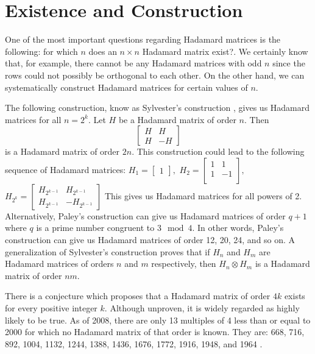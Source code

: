 \documentclass{article}
\theoremstyle{definition}
\begin{document}
\section{Existence and Construction}
One of the most important questions regarding Hadamard matrices is the following: for which $n$ does an $n \times n$ Hadamard matrix exist?. We certainly know that, for example, there cannot be any Hadamard matrices with odd $n$ since the rows could not possibly be orthogonal to each other. On the other hand, we can systematically construct Hadamard matrices for certain values of $n$.

The following construction, know as Sylvester's construction \cite{construction}, gives us Hadamard matrices for all $n = 2^k$. Let $H$ be a Hadamard matrix of order $n$. Then
\begin{equation*}
\begin{bmatrix}
H & H \\
H & -H
\end{bmatrix}
\end{equation*}
is a Hadamard matrix of order $2n$. This construction could lead to the following sequence of Hadamard matrices:
$H_1 =
\begin{bmatrix}
1
\end{bmatrix},
$
$H_2 =
\begin{bmatrix}
1 & 1 \\
1 & -1 \\
\end{bmatrix},
$
$H_{2^k} =
\begin{bmatrix}
H_{2^{k-1}} & H_{2^{k-1}} \\
H_{2^{k-1}} & -H_{2^{k-1}}
\end{bmatrix}
$
This gives us Hadamard matrices for all powers of 2. Alternatively, Paley's construction can give us Hadamard matrices of order $q +1$ where $q$ is a prime number congruent to $3 \mod 4$. In other words, Paley's construction can give us Hadamard matrices of order 12, 20, 24, and so on.  A generalization of Sylvester's construction proves that if $H_n$ and $H_m$ are Hadamard matrices of orders $n$ and $m$ respectively, then $H_n \otimes H_m$ is a Hadamard matrix of order $nm$.

There is a conjecture which proposes that a Hadamard matrix of order $4k$ exists for every positive integer $k$. Although unproven, it is widely regarded as highly likely to be true. As of 2008, there are only 13 multiples of 4 less than or equal to 2000 for which no Hadamard matrix of that order is known. They are: 668, 716, 892, 1004, 1132, 1244, 1388, 1436, 1676, 1772, 1916, 1948, and 1964 \cite{existence}.
\end{document}
